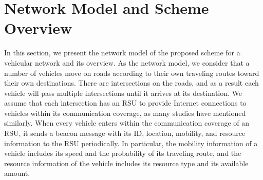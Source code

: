 \documentclass[electronics,aricle,accept,pdftex,moreauthors]{Definitions/mdpi}
\begin{document}




\section{Network Model and Scheme Overview} \label{net}


In this section, we present the network model of the proposed scheme for a vehicular network and its overview.
As the network model, we consider that a number of vehicles move on roads according to their own traveling routes toward their own destinations.
There are intersections on the roads, and as a result each vehicle will pass multiple intersections until it arrives at its destination.
We assume that each intersection has an RSU to provide Internet connections to vehicles within its communication coverage, as many studies \cite{Gao2018, Yu2022} have mentioned similarly.
When every vehicle enters within the communication coverage of an RSU, it sends a beacon message with its ID, location, mobility, and resource information to the RSU periodically.
In particular, the mobility information of a vehicle includes its speed and the probability of its traveling route, and the resource information of the vehicle includes its resource type and its available amount.
\end{document}
